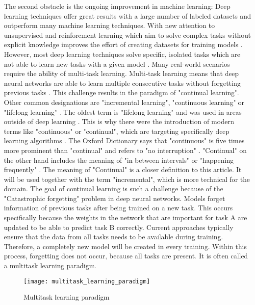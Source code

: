 The second obstacle is the ongoing improvement in machine learning:
\hfill \break
Deep learning techniques offer great results with a large number of labeled datasets and outperform many machine learning techniques.
With new attention to unsupervised and reinforement learning which aim to solve complex tasks without explicit knowledge improves the effort of creating datasets for training models \cite{continual-ai-blog, alphastar}.
However, most deep learning techniques solve specific, isolated tasks which are not able to learn new tasks with a given model \cite{continual-ai-blog}.
Many real-world scenarios require the ability of multi-task learning.
Multi-task learning means that deep neural networks are able to learn multiple consecutive tasks without forgetting previous tasks \cite{elastic-weight-consolidation}.
This challenge results in the paradigm of "continual learning".
Other common designations are "incremental learning", "continuous learning" or "lifelong learning" \cite{lifelong-machine-learning-book, continual-ai-blog}.
The oldest term is "lifelong learning" and was used in areas outside of deep learning \cite{continual-ai-blog}.
This is why there were the introduction of modern terms like "continuous" or "continual", which are targeting specifically deep learning algorithms \cite{continual-ai-blog}.
The Oxford Dictionary says that "continuous" is five times more prominent than "continual" and refers to "no interruption" \cite{oxford-continual-continuous}. "Continual" on the other hand includes the meaning of "in between intervals" or "happening frequently" \cite{oxford-continual-continuous}.
The meaning of "Continual" is a closer definition to this article.
It will be used together with the term "incremental", which is more technical for the domain.
\hfill \break
The goal of continual learning is such a challenge because of the "Catastrophic forgetting" problem in deep neural networks.
Models forget information of previous tasks after being trained on a new task.
This occurs specifically because the weights in the network that are important for task A are updated to be able to predict task B correctly.
Current approaches typically ensure that the data from all tasks needs to be available during training.
Therefore, a completely new model will be created in every training.
Within this process, forgetting does not occur, because
all tasks are present.
It is often called a multitask learning paradigm.
\cite{incremental-moment-matching, continual-ai-blog}

\begin{figure}[H]
    \centering
    \texttt{[image: multitask\_learning\_paradigm]}
    \caption{Multitask learning paradigm}
    \label{fig:intro_motivation_multitask_learning_paradigm}
\end{figure}

